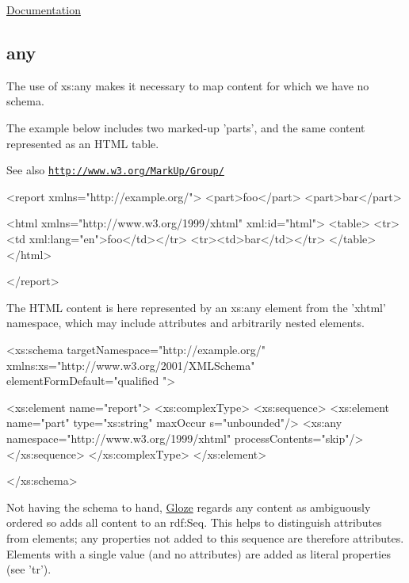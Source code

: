 \begin{DoxyItemize}
\item \hyperlink{documentation}{Documentation} 
\end{DoxyItemize}\hypertarget{any}{}\subsection{any}\label{any}
The use of xs:any makes it necessary to map content for which we have no schema.

The example below includes two marked-\/up 'parts', and the same content represented as an HTML table. \begin{DoxySeeAlso}{See also}
\href{http://www.w3.org/MarkUp/Group/}{\tt http://www.w3.org/MarkUp/Group/}
\end{DoxySeeAlso}

\begin{DoxyCodeInclude}
<report xmlns="http://example.org/">
  <part>foo</part>
  <part>bar</part>
  
  <html xmlns="http://www.w3.org/1999/xhtml" xml:id="html">           
    <table>
      <tr><td xml:lang="en">foo</td></tr>
      <tr><td>bar</td></tr>
    </table>
  </html>

</report>
\end{DoxyCodeInclude}


The HTML content is here represented by an xs:any element from the 'xhtml' namespace, which may include attributes and arbitrarily nested elements.


\begin{DoxyCodeInclude}
<xs:schema targetNamespace="http://example.org/"
        xmlns:xs="http://www.w3.org/2001/XMLSchema" elementFormDefault="qualified
      ">

        <xs:element name="report">
                <xs:complexType>
                        <xs:sequence>
                                <xs:element name="part" type="xs:string" maxOccur
      s="unbounded"/>
                                <xs:any namespace="http://www.w3.org/1999/xhtml" 
      processContents="skip"/>        
                        </xs:sequence>
                </xs:complexType>
        </xs:element>

</xs:schema>

\end{DoxyCodeInclude}


Not having the schema to hand, \hyperlink{classcom_1_1hp_1_1gloze_1_1_gloze}{Gloze} regards any content as ambiguously ordered so adds all content to an rdf:Seq. This helps to distinguish attributes from elements; any properties not added to this sequence are therefore attributes. Elements with a single value (and no attributes) are added as literal properties (see 'tr').


